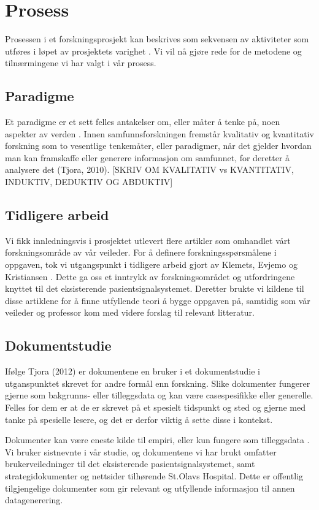 \section{Prosess}
\label{chp: prosess}

Prosessen i et forskningsprosjekt kan beskrives som sekvensen av aktiviteter som utføres i løpet av prosjektets varighet \cite{Oates}. Vi vil nå gjøre rede for de metodene og tilnærmingene vi har valgt i vår prosess.

\subsection{Paradigme}
Et paradigme er et sett felles antakelser om, eller måter å tenke på, noen aspekter av verden \cite{Oates}. Innen samfunnsforskningen fremstår kvalitativ og kvantitativ forskning som to vesentlige tenkemåter, eller paradigmer, når det gjelder hvordan man kan framskaffe eller generere informasjon om samfunnet, for deretter å analysere det (Tjora, 2010).
[SKRIV OM KVALITATIV vs KVANTITATIV, INDUKTIV, DEDUKTIV OG ABDUKTIV]

\subsection{Tidligere arbeid}
Vi fikk innledningsvis i prosjektet utlevert flere artikler som omhandlet vårt forskningsområde av vår veileder. For å definere forskningsspørsmålene i oppgaven, tok vi utgangspunkt i tidligere arbeid gjort av Klemets, Evjemo og Kristiansen \cite{klemets13, Klemets12, KlemetsRedundancy}. Dette ga oss et inntrykk av forskningsområdet og utfordringene knyttet til det eksisterende pasientsignalsystemet. Deretter brukte vi kildene til disse artiklene for å finne utfyllende teori å bygge oppgaven på, samtidig som vår veileder og professor kom med videre forslag til relevant litteratur.  

\subsection{Dokumentstudie}
Ifølge Tjora (2012) er dokumentene en bruker i et dokumentstudie i utganspunktet skrevet for andre formål enn forskning. Slike dokumenter fungerer gjerne som bakgrunns- eller tilleggsdata og kan være casespesifikke eller generelle. Felles for dem er at de er skrevet på et spesielt tidspunkt og sted og gjerne med tanke på spesielle lesere, og det er derfor viktig å sette disse i kontekst. 

\noindent
Dokumenter kan være eneste kilde til empiri, eller kun fungere som tilleggsdata \cite{Tjora}. Vi bruker sistnevnte i vår studie, og dokumentene vi har brukt omfatter brukerveiledninger til det eksisterende pasientsignalsystemet, samt strategidokumenter og nettsider tilhørende St.Olavs Hospital. Dette er offentlig tilgjengelige dokumenter som gir relevant og utfyllende informasjon til annen datagenerering.

